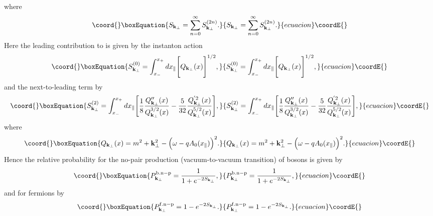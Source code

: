 \documentclass[a4paper,prd,showpacs,preprintnumbers,amsmath,amssymb]{revtex4}
\begin{document}
where
\begin{equation}\coord{}\boxEquation{
S_{{\bf k}_{\perp}} = \sum_{n=0}^{\infty} S^{(2n)}_{{\bf
k}_{\perp}}.
}{
S_{{\bf k}_{\perp}} = \sum_{n=0}^{\infty} S^{(2n)}_{{\bf
k}_{\perp}}.
}{ecuacion}\coordE{}\end{equation}
Here the leading contribution to \coordHE{} is given by
the instanton action
\begin{equation}\coord{}\boxEquation{
S^{(0)}_{{\bf k}_{\perp}} =  \int_{x_-}^{x_+} dx_{\parallel}
\Biggl[ Q_{{\bf k}_{\perp}}(x) \Biggr]^{1/2}, \label{inh inst}
}{
S^{(0)}_{{\bf k}_{\perp}} =  \int_{x_-}^{x_+} dx_{\parallel}
\Biggl[ Q_{{\bf k}_{\perp}}(x) \Biggr]^{1/2}, }{ecuacion}\coordE{}\end{equation}
and the next-to-leading term by
\begin{equation}\coord{}\boxEquation{
S^{(2)}_{{\bf k}_{\perp}} = \int_{x_-}^{x_+} dx_{\parallel}
\Biggl[\frac{1}{8}\frac{Q_{{\bf k}_{\perp}}''(x)}{Q^{3/2}_{{\bf
k}_{\perp}}(x)} - \frac{5}{32}\frac{Q^{'2}_{{\bf
k}_{\perp}}(x)}{Q^{5/2}_{{\bf k}_{\perp}}(x)} \Biggr],
}{
S^{(2)}_{{\bf k}_{\perp}} = \int_{x_-}^{x_+} dx_{\parallel}
\Biggl[\frac{1}{8}\frac{Q_{{\bf k}_{\perp}}''(x)}{Q^{3/2}_{{\bf
k}_{\perp}}(x)} - \frac{5}{32}\frac{Q^{'2}_{{\bf
k}_{\perp}}(x)}{Q^{5/2}_{{\bf k}_{\perp}}(x)} \Biggr],
}{ecuacion}\coordE{}\end{equation}
where
\begin{equation}\coord{}\boxEquation{
Q_{{\bf k}_{\perp}}(x) = m^2 + {\bf k}_{\perp}^2 - \Bigl( \omega -
q A_0 ( x_{\parallel}) \Bigr)^2.
}{
Q_{{\bf k}_{\perp}}(x) = m^2 + {\bf k}_{\perp}^2 - \Bigl( \omega -
q A_0 ( x_{\parallel}) \Bigr)^2.
}{ecuacion}\coordE{}\end{equation}
Hence the relative probability for the no-pair production
(vacuum-to-vacuum transition) of bosons is given by
\begin{equation}\coord{}\boxEquation{
P^{\rm b.n-p}_{{\bf k}_{\perp}} = \frac{1}{1+ e^{- 2 S_{{\bf
k}_{\perp}}}},
}{
P^{\rm b.n-p}_{{\bf k}_{\perp}} = \frac{1}{1+ e^{- 2 S_{{\bf
k}_{\perp}}}},
}{ecuacion}\coordE{}\end{equation}
and for fermions by
\begin{equation}\coord{}\boxEquation{
P^{\rm f.n-p}_{{\bf k}_{\perp}} = 1 - e^{- 2 S_{{\bf k}_{\perp}}}.
}{
P^{\rm f.n-p}_{{\bf k}_{\perp}} = 1 - e^{- 2 S_{{\bf k}_{\perp}}}.
}{ecuacion}\coordE{}\end{equation}
\end{document}
